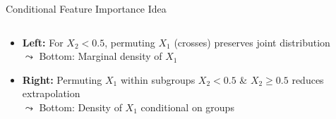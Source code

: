 \documentclass[11pt,compress,t,notes=noshow, aspectratio=169, xcolor=table]{beamer}
\begin{document}
\begin{frame}{Conditional Feature Importance Idea}
{\begin{columns}[T, totalwidth = \linewidth]
\begin{column}{0.52\textwidth}
\begin{itemize}
    \item \textbf{Left:} For $X_2<0.5$, permuting $X_1$ (crosses) preserves joint distribution\\
    $\leadsto$ Bottom: Marginal density of $X_1$
    \item \textbf{Right:} Permuting $X_1$ within subgroups $X_2<0.5$ \& $X_2\geq 0.5$ reduces extrapolation\\
    $\leadsto$ Bottom: Density of $X_1$ conditional on groups
\end{itemize}
\end{column}
\end{columns}
}
\end{frame}
\end{document}
